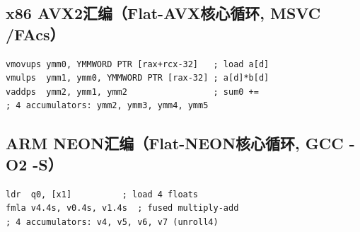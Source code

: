 \documentclass[11pt,a4paper]{article}
\begin{document}
\subsection{x86 AVX2汇编（Flat-AVX核心循环, MSVC /FAcs）}
\begin{lstlisting}[language={[x86masm]Assembler},numbers=none]
vmovups ymm0, YMMWORD PTR [rax+rcx-32]   ; load a[d]
vmulps  ymm1, ymm0, YMMWORD PTR [rax-32] ; a[d]*b[d]
vaddps  ymm2, ymm1, ymm2                 ; sum0 +=
; 4 accumulators: ymm2, ymm3, ymm4, ymm5
\end{lstlisting}

\subsection{ARM NEON汇编（Flat-NEON核心循环, GCC -O2 -S）}
\begin{lstlisting}[language={[x86masm]Assembler},numbers=none]
ldr  q0, [x1]          ; load 4 floats
fmla v4.4s, v0.4s, v1.4s  ; fused multiply-add
; 4 accumulators: v4, v5, v6, v7 (unroll4)
\end{lstlisting}
\end{document}
